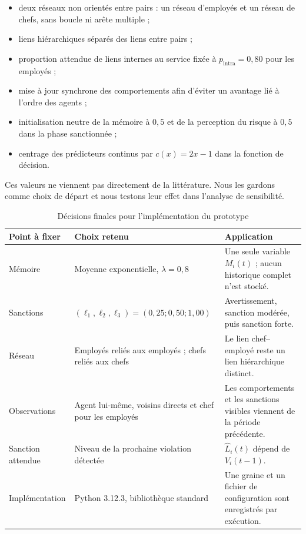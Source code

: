 \documentclass[11pt,a4paper]{article}
\begin{document}
\begin{itemize}
  \item deux réseaux non orientés entre pairs : un réseau d’employés et un
  réseau de chefs, sans boucle ni arête multiple ;
  \item liens hiérarchiques séparés des liens entre pairs ;
  \item proportion attendue de liens internes au service fixée à
  $p_{\mathrm{intra}}=0{,}80$ pour les employés ;
  \item mise à jour synchrone des comportements afin d’éviter un avantage lié à
  l’ordre des agents ;
  \item initialisation neutre de la mémoire à $0{,}5$ et de la perception du
  risque à $0{,}5$ dans la phase sanctionnée ;
  \item centrage des prédicteurs continus par $c(x)=2x-1$ dans la fonction de
  décision.
\end{itemize}

Ces valeurs ne viennent pas directement de la littérature. Nous les gardons
comme choix de départ et nous testons leur effet dans l’analyse de sensibilité.

\begin{table}[H]
\centering
\caption{Décisions finales pour l’implémentation du prototype}
\label{tab:finalchoices}
\begin{tabularx}{\textwidth}{@{}L{36mm}L{49mm}Y@{}}
\toprule
{}
\color{white}\textbf{Point à fixer} &
\color{white}\textbf{Choix retenu} &
\color{white}\textbf{Application}\\
\midrule
Mémoire &
Moyenne exponentielle, $\lambda=0{,}8$ &
Une seule variable $M_i(t)$ ; aucun historique complet n’est stocké.\\
Sanctions &
$(\ell_1,\ell_2,\ell_3)=(0{,}25;0{,}50;1{,}00)$ &
Avertissement, sanction modérée, puis sanction forte.\\
Réseau &
Employés reliés aux employés ; chefs reliés aux chefs &
Le lien chef--employé reste un lien hiérarchique distinct.\\
Observations &
Agent lui-même, voisins directs et chef pour les employés &
Les comportements et les sanctions visibles viennent de la période précédente.\\
Sanction attendue &
Niveau de la prochaine violation détectée &
$\widehat L_i(t)$ dépend de $V_i(t-1)$.\\
Implémentation &
Python 3.12.3, bibliothèque standard &
Une graine et un fichier de configuration sont enregistrés par exécution.\\
\bottomrule
\end{tabularx}
\end{table}
\end{document}
